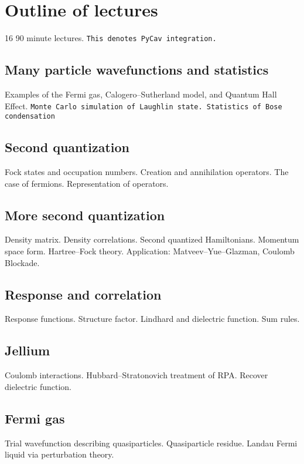 \section{Outline of lectures}

16 90 minute lectures. \verb|This denotes PyCav integration.|

\subsection{Many particle wavefunctions and statistics}

Examples of the Fermi gas, Calogero--Sutherland model, and Quantum Hall Effect. \verb|Monte Carlo simulation of Laughlin state. Statistics of Bose condensation|

\subsection{Second quantization}

Fock states and occupation numbers. Creation and annihilation operators. The case of fermions. Representation of operators.

\subsection{More second quantization}

Density matrix. Density correlations. Second quantized Hamiltonians. Momentum space form. Hartree--Fock theory. Application: Matveev--Yue--Glazman, Coulomb Blockade. 

\subsection{Response and correlation}

Response functions. Structure factor. Lindhard and dielectric function. Sum rules.

\subsection{Jellium}

Coulomb interactions. Hubbard--Stratonovich treatment of RPA. Recover dielectric function.

\subsection{Fermi gas}

Trial wavefunction describing quasiparticles. Quasiparticle residue. Landau Fermi liquid via perturbation theory. 

